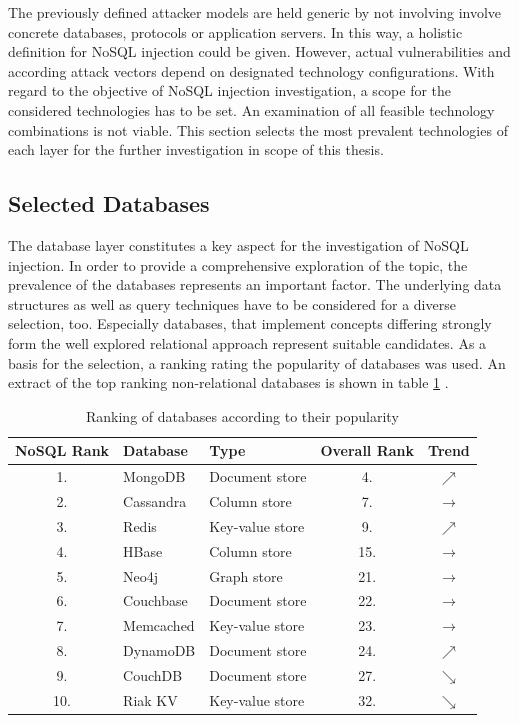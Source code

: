 The previously defined attacker models are held generic by not involving involve concrete databases, protocols or application servers. In this way, a holistic definition for NoSQL injection could be given. However, actual vulnerabilities and according attack vectors depend on designated technology configurations. With regard to the objective of NoSQL injection investigation, a scope for the considered technologies has to be set. An examination of all feasible technology combinations is not viable. This section selects the most prevalent technologies of each layer for the further investigation in scope of this thesis.

\subsection{Selected Databases}

The database layer constitutes a key aspect for the investigation of NoSQL injection. In order to provide a comprehensive exploration of the topic, the prevalence of the databases represents an important factor. The underlying data structures as well as query techniques have to be considered for a diverse selection, too. Especially databases, that implement concepts differing strongly form the well explored relational approach represent suitable candidates. As a basis for the selection, a ranking rating the popularity of databases was used. An extract of the top ranking non-relational databases is shown in table \ref{tab:db_ranking} \cite{Solid2016}.


\begin{table}[h] 
 \centering
 \begin{tabular}{cllcc}
  \textbf{NoSQL Rank} & \textbf{Database} & \textbf{Type} & \textbf{Overall Rank} & \textbf{Trend} \\ \hline
  \rowcolor{light-gray} 1. &  MongoDB     & Document store & 4. & $\scriptstyle\nearrow$ \\
  2. &  Cassandra   & Column store & 7. & $\rightarrow$ \\
  \rowcolor{light-gray} 3. &  Redis       & Key-value store & 9. & $\scriptstyle\nearrow$ \\
  4. &  HBase       & Column store & 15. & $\rightarrow$ \\
  5. &  Neo4j       & Graph store & 21. & $\rightarrow$ \\
  6. &  Couchbase  & Document store & 22. & $\rightarrow$ \\
  \rowcolor{light-gray} 7. &  Memcached & Key-value store & 23. & $\rightarrow$ \\
  8. &  DynamoDB & Document store & 24. & $\scriptstyle\nearrow$ \\
  \rowcolor{light-gray} 9. &  CouchDB   & Document store & 27. & $\scriptstyle\searrow$ \\
  10. &  Riak KV & Key-value store & 32. & $\scriptstyle\searrow$ \\
  \bottomrule
 \end{tabular}
 \caption{Ranking of databases according to their popularity}
 \label{tab:db_ranking}
\end{table}

